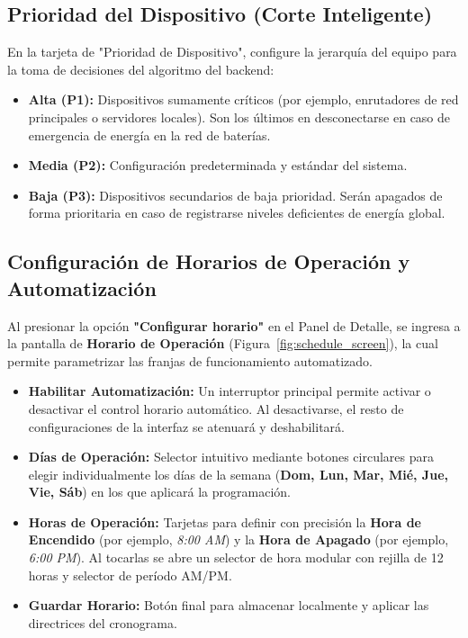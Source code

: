 \documentclass[11pt,a4paper]{article}
\begin{document}
\subsection{Prioridad del Dispositivo (Corte Inteligente)}
En la tarjeta de "Prioridad de Dispositivo", configure la jerarquía del equipo para la toma de decisiones del algoritmo del backend:
\begin{itemize}
    \item \textbf{Alta (P1):} Dispositivos sumamente críticos (por ejemplo, enrutadores de red principales o servidores locales). Son los últimos en desconectarse en caso de emergencia de energía en la red de baterías.
    \item \textbf{Media (P2):} Configuración predeterminada y estándar del sistema.
    \item \textbf{Baja (P3):} Dispositivos secundarios de baja prioridad. Serán apagados de forma prioritaria en caso de registrarse niveles deficientes de energía global.
\end{itemize}

\subsection{Configuración de Horarios de Operación y Automatización}
Al presionar la opción \textbf{"Configurar horario"} en el Panel de Detalle, se ingresa a la pantalla de \textbf{Horario de Operación} (Figura~\ref{fig:schedule_screen}), la cual permite parametrizar las franjas de funcionamiento automatizado.

\begin{itemize}
    \item \textbf{Habilitar Automatización:} Un interruptor principal permite activar o desactivar el control horario automático. Al desactivarse, el resto de configuraciones de la interfaz se atenuará y deshabilitará.
    \item \textbf{Días de Operación:} Selector intuitivo mediante botones circulares para elegir individualmente los días de la semana (\textbf{Dom, Lun, Mar, Mié, Jue, Vie, Sáb}) en los que aplicará la programación.
    \item \textbf{Horas de Operación:} Tarjetas para definir con precisión la \textbf{Hora de Encendido} (por ejemplo, \textit{8:00 AM}) y la \textbf{Hora de Apagado} (por ejemplo, \textit{6:00 PM}). Al tocarlas se abre un selector de hora modular con rejilla de 12 horas y selector de período AM/PM.
    \item \textbf{Guardar Horario:} Botón final para almacenar localmente y aplicar las directrices del cronograma.
\end{itemize}
\end{document}

